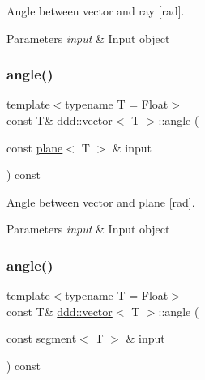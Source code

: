 Angle between vector and ray \mbox{[}rad\mbox{]}. 


\begin{DoxyParams}{Parameters}
{\em input} & Input object \\
\hline
\end{DoxyParams}
\mbox{\label{classddd_1_1vector_a6e6f7e86378329051b53b969bdb607ae}} 
\subsubsection{\texorpdfstring{angle()}{angle()}\hspace{0.1cm}{\footnotesize\ttfamily [4/5]}}
{\footnotesize\ttfamily template$<$typename T = Float$>$ \\
const T\& \hyperlink{classddd_1_1vector}{ddd\+::vector}$<$ T $>$\+::angle (\begin{DoxyParamCaption}\item[{const \hyperlink{classddd_1_1plane}{plane}$<$ T $>$ \&}]{input }\end{DoxyParamCaption}) const\hspace{0.3cm}{\ttfamily [inline]}}



Angle between vector and plane \mbox{[}rad\mbox{]}. 


\begin{DoxyParams}{Parameters}
{\em input} & Input object \\
\hline
\end{DoxyParams}
\mbox{\label{classddd_1_1vector_aa1d50d563f55d5795d565ed70ec5b845}} 
\subsubsection{\texorpdfstring{angle()}{angle()}\hspace{0.1cm}{\footnotesize\ttfamily [5/5]}}
{\footnotesize\ttfamily template$<$typename T = Float$>$ \\
const T\& \hyperlink{classddd_1_1vector}{ddd\+::vector}$<$ T $>$\+::angle (\begin{DoxyParamCaption}\item[{const \hyperlink{classddd_1_1segment}{segment}$<$ T $>$ \&}]{input }\end{DoxyParamCaption}) const\hspace{0.3cm}{\ttfamily [inline]}}



